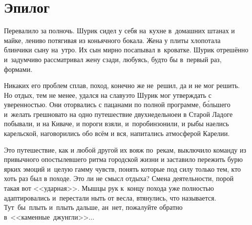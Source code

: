 
{
\cleardoublepage



\fancyhead[LE]{\fancyplain{}{}}
\fancyhead[RO]{\fancyplain{}{}}

\section*{Эпилог}


Перевалило за полночь. Шурик сидел у себя на~кухне в~домашних штанах и майке, лениво потягивая из коньячного бокала. Жена у плиты хлопотала блинчики сыну на~утро. Их сын мирно посапывал в~кроватке. Шурик отрешённо и~задумчиво рассматривал жену сзади, любуясь, будто бы в~первый раз, формами. 

Никаких его проблем сплав, поход, конечно же не~решил, да и не мог решить. Но отдых, тем не менее, удался на славу\mdash это Шурик мог утверждать с уверенностью. Они оторвались с пацанами по полной программе, б\'{о}льшего и~желать грешновато на одно путешествие двухнедельное\mdash и в Старой Ладоге побывали, и на Киваче, и пороги взяли, и~поробинзонили, и рыбы наелись карельской, наговорились обо всём и вся, напитались атмосферой Карелии.

Это путешествие, как и любой другой их вояж по~рекам, выключило команду из привычного опостылевшего ритма городской жизни и заставило пережить бурю ярких эмоций и~целую гамму чувств, понять которые под силу только тем, кто хоть раз был в походе. Это ли не смысл отдыха? Смена деятельности, порой такая вот <<ударная>>. Мышцы рук к~концу похода уже полностью адаптировались и~перестали ныть от весла, втянулись, что называется. Тут~бы~плыть и~плыть дальше, ан~нет, пожалуйте обратно в~<<каменные~джунгли>>$\ldots$

}

